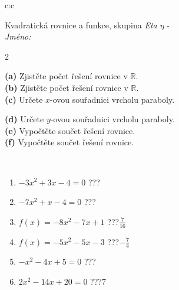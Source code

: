 \documentclass[10pt]{report}
\begin{document}
\begin{tabular}{c:c}
\begin{minipage}[c][104.5mm][t]{0.5\linewidth}
\begin{center}
\vspace{7mm}
{\huge \LARGE Kvadratická rovnice a funkce, skupina \textit{Eta $\eta$} -}\\[5mm]
\textit{Jméno:}\phantom{xxxxxxxxxxxxxxxxxxxxxxxxxxxxxxxxxxxxxxxxxxxxxxxxxxxxxxxxxxxxxxxxx}\\[5mm]
\begin{minipage}{0.95\linewidth}
\begin{center}
{\small \begin{multicols}{2} \raggedright
\textbf{(a)} Zjistěte počet řešení rovnice v \(\mathbb{R}\). \\[1mm]
\textbf{(b)} Zjistěte počet řešení rovnice v \(\mathbb{R}\). \\[1mm]
\textbf{(c)} Určete \(x\)-ovou souřadnici vrcholu paraboly. \par \columnbreak
\textbf{(d)} Určete \(y\)-ovou souřadnici vrcholu paraboly. \\[1mm]
\textbf{(e)} Vypočtěte součet řešení rovnice. \\[1mm]
\textbf{(f)} Vypočtěte součet řešení rovnice.
\end{multicols}
}
\end{center}
\end{minipage}
\\[4mm]
\begin{minipage}{0.79\linewidth}
\begin{center}
\begin{varwidth}{\linewidth}
\begin{enumerate}
\Large
\item $-3x^2+3x-4=0$\quad \dotfill\; ???\;\dotfill {}
\item $-7x^2+x-4=0$\quad \dotfill\; ???\;\dotfill {}
\item $f(x)=-8x^2-7x+1$\quad \dotfill\; ???\;\dotfill \quad $\frac{7}{16}$
\item $f(x)=-5x^2-5x-3$\quad \dotfill\; ???\;\dotfill \quad $-\frac{7}{4}$
\item $-x^2-4x+5=0$\quad \dotfill\; ???\;\dotfill {}
\item $2x^2-14x+20=0$\quad \dotfill\; ???\;\dotfill \quad $7$
\end{enumerate}
\end{varwidth}
\end{center}
\end{minipage}

\end{center}
\end{minipage}
\end{tabular}
\end{document}
